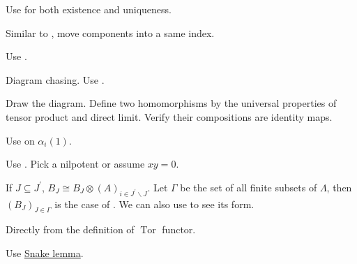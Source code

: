 \begin{exercise}\label{ex2.16}
	Use  for both existence and uniqueness.
\end{exercise}

\begin{exercise}\label{ex2.17}
	Similar to , move components into a same index.
\end{exercise}

\begin{exercise}\label{ex2.18}
	Use .
\end{exercise}

\begin{exercise}\label{ex2.19}
	Diagram chasing. Use .
\end{exercise}

\begin{exercise}\label{ex2.20}
	Draw the diagram. Define two homomorphisms by the universal properties of tensor product and direct limit. Verify their compositions are identity maps. 
\end{exercise}

\begin{exercise}\label{ex2.21}
	Use  on $\alpha_i(1)$.
\end{exercise}

\begin{exercise}\label{ex2.22}
	Use . Pick a nilpotent or assume $xy=0$.
\end{exercise}

\begin{exercise}\label{ex2.23}
	If $J\subseteq J^\prime$, $B_J\cong B_J\otimes\left(A\right)_{i\in J^\prime\backslash J}$. Let $\Gamma$ be the set of all finite subsets of $\Lambda$, then $\left(B_J\right)_{J\in\Gamma}$ is the case of . We can also use  to see its form.
\end{exercise}

\begin{exercise}\label{ex2.24}
	Directly from the definition of $\operatorname{Tor}$ functor.
\end{exercise}

\begin{exercise}\label{ex2.25}
	Use \hyperref[2.10]{Snake lemma}.
\end{exercise}

